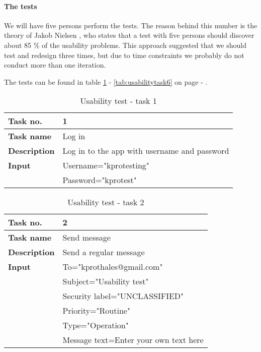 \paragraph{The tests}\hfill
\newline
We will have five persons perform the tests. The reason behind this number is the theory of Jakob Nielsen \cite{bib:useit}, who states that a test with five persons should discover about 85 \% of the usability problems. This approach suggested that we should test and redesign three times, but due to time constraints we probably do not conduct more than one iteration.  
\newline

The tests can be found in table \ref{tab:usabilitytask1} - \ref{tab:usabilitytask6} on page \pageref{tab:usabilitytask1} - \pageref{tab:usabilitytask6}.

\begin{table}[h!]
\begin{center}
\begin{tabular}{>{\bfseries}l|l} \hline
Task no.&1\\ \hline
Task name&Log in\\ \hline
Description&Log in to the app with username and password\\ \hline
Input&Username="kprotesting" \\
&Password="kprotest"\\ \hline
\end{tabular}
\end{center}
\caption{Usability test - task 1} \label{tab:usabilitytask1}
\end{table}

\begin{table}[h!]
\begin{center}
\begin{tabular}{>{\bfseries}l|l}\hline
Task no.&2\\ \hline
Task name&Send message\\ \hline
Description&Send a regular message\\ \hline
Input&To="kprothales@gmail.com" \\
&Subject="Usability test"\\
&Security label="UNCLASSIFIED"\\ 
&Priority="Routine"\\
&Type="Operation"\\
&Message text=Enter your own text here\\ \hline
\end{tabular}
\end{center}
\caption{Usability test - task 2} \label{tab:usabilitytask2}
\end{table}


